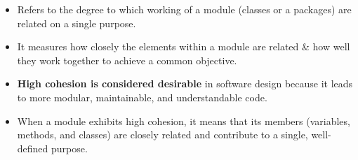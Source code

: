 \setlength{\columnsep}{3pt}
\begin{flushleft}

	\begin{itemize}
		\item Refers to the degree to which working of a module (classes or a packages) are related on a single purpose. 
		\bigskip
		\item It measures how closely the elements within a module are related \& how well they work together to achieve a common objective.
		\bigskip
		\item \textbf{High cohesion is considered desirable} in software design because it leads to more modular, maintainable, and understandable code. 
		\bigskip
		\item When a module exhibits high cohesion, it means that its members (variables, methods, and classes) are closely related and contribute to a single, well-defined purpose.
	\end{itemize}	
	
\end{flushleft}

\newpage
